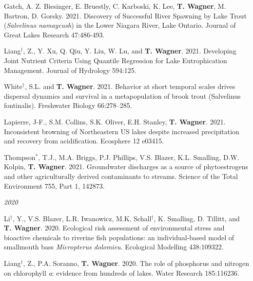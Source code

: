 \documentclass[10pt]{article}
\begin{document}
\begin{flushleft}
\begin{etaremune}[start=117]
\item Gatch, A. Z. Biesinger, E. Bruestly, C. Karboski, K. Lee, \textbf{T. Wagner}, M. Bartron, D. Gorsky.  2021. Discovery of Successful River Spawning by Lake Trout (\textit{Salvelinus namaycush}) in the Lower Niagara River, Lake Ontario. Journal of Great Lakes Research 47:486-493.

\item Liang$^\dagger$, Z., Y. Xu, Q. Qiu, Y. Liu, W. Lu, and \textbf{T. Wagner}.  2021. Developing Joint Nutrient Criteria Using Quantile Regression for Lake Eutrophication Management. Journal of Hydrology 594:125.


\item White$^\dagger$, S.L. and \textbf{T. Wagner}.  2021. Behavior at short temporal scales drives dispersal dynamics and survival in a metapopulation of brook trout (Salvelinus fontinalis). Freshwater Biology 66:278–285.


\item Lapierre, J-F., S.M. Collins, S.K. Oliver, E.H. Stanley, \textbf{T. Wagner}. 2021.  Inconsistent browning of Northeastern US lakes despite increased precipitation and recovery from acidification. Ecosphere 12 e03415.

\item Thompson$^*$, T.J., M.A. Briggs, P.J. Phillips, V.S. Blazer, K.L. Smalling, D.W. Kolpin, \textbf{T. Wagner}.  2021. Groundwater discharges as a source of phytoestrogens and other agriculturally derived contaminants to streams. Science of the Total Environment 755, Part 1, 142873.

\end{etaremune}

\vspace{5pt}
\emph{2020}
\begin{etaremune}[start=103]


\item Li$^\dagger$, Y., V.S. Blazer, L.R. Iwanowicz, M.K. Schall$^\dagger$, K. Smalling, D. Tillitt, and \textbf{T. Wagner}. 2020. Ecological risk assessment of environmental stress and bioactive chemicals to riverine fish populations: an individual-based model of smallmouth bass \textit{Micropterus dolomieu}. Ecological Modelling 438:109322.

\item Liang$^\dagger$, Z., P.A. Soranno, \textbf{T. Wagner}. 2020. The role of phosphorus and nitrogen on chlorophyll \textit{a}: evidence from hundreds of lakes. Water Research 185:116236.


\end{etaremune}
\end{flushleft}
\end{document}
